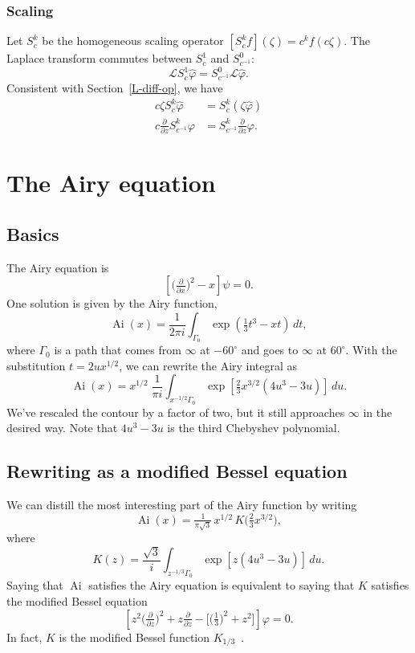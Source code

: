 \documentclass{article}
\theoremstyle{definition}
\theoremstyle{plain}
\newcommand{\laplace}{\mathcal{L}}
\DeclareMathOperator{\Ai}{Ai}
\begin{document}
\subsubsection{Scaling}
Let $S^k_c$ be the homogeneous scaling operator $[S^k_c f](\zeta) = c^k f(c \zeta)$. The Laplace transform commutes between $S^1_c$ and $S^0_{c^{-1}}$:
\[ \laplace S^1_c \hat{\varphi} = S^0_{c^{-1}} \laplace \hat{\varphi}. \]
Consistent with Section~\ref{L-diff-op}, we have
\begin{align*}
c\zeta S^k_c \hat{\varphi} & = S^k_c(\zeta \hat{\varphi}) \\
c \tfrac{\partial}{\partial z} S^k_{c^{-1}} \varphi & = S^k_{c^{-1}} \tfrac{\partial}{\partial z} \varphi.
\end{align*}
\section{The Airy equation}
\subsection{Basics}
The Airy equation is
\begin{equation}\label{eqn:airy}
\left[\big(\tfrac{\partial}{\partial x}\big)^2 - x\right] \psi = 0.
\end{equation}
One solution is given by the Airy function,
\[ \Ai(x) = \frac{1}{2\pi i} \int_{\Gamma_0} \exp\left(\tfrac{1}{3}t^3 - xt\right)\,dt, \]
where $\Gamma_0$ is a path that comes from $\infty$ at $-60^\circ$ and goes to $\infty$ at $60^\circ$. With the substitution $t = 2ux^{1/2}$, we can rewrite the Airy integral as
\[ \Ai(x) = x^{1/2}\;\frac{1}{\pi i} \int_{x^{-1/2} \Gamma_0} \exp\left[\tfrac{2}{3}x^{3/2} \left(4u^3 - 3u\right)\right]\,du. \]
We've rescaled the contour by a factor of two, but it still approaches $\infty$ in the desired way. Note that $4u^3 - 3u$ is the third Chebyshev polynomial.
\subsection{Rewriting as a modified Bessel equation}
We can distill the most interesting part of the Airy function by writing
\[ \Ai(x) = \tfrac{1}{\pi\sqrt{3}}\,x^{1/2}\, K\big(\tfrac{2}{3} x^{3/2}\big), \]
where
\[ K(z) = \frac{\sqrt{3}}{i} \int_{z^{-1/3}\Gamma_0} \exp\left[z \left(4u^3 - 3u\right)\right]\,du. \]
Saying that $\Ai$ satisfies the Airy equation is equivalent to saying that $K$ satisfies the modified Bessel equation
\begin{equation}\label{eqn:mod-bessel}
\left[z^2 \big(\tfrac{\partial}{\partial z}\big)^2 + z \tfrac{\partial}{\partial z} - \big[\big(\tfrac{1}{3}\big)^2 + z^2\big]\right] \varphi = 0.
\end{equation}
In fact, $K$ is the modified Bessel function $K_{1/3}$~\cite[equation~9.6.1]{dlmf}.
\end{document}
